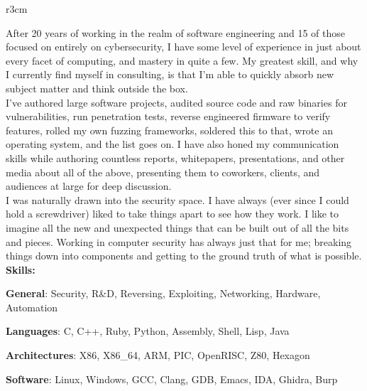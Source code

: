 \documentclass[]{SBResume}
\begin{document}
\makeheader


\begin{resume}
  
  \begin{resumetext}
    \begin{wrapfigure}{r}{3cm}
    \insertheadshot
    \end{wrapfigure}

    After 20 years of working in the realm of software engineering and 15 of
    those focused on entirely on cybersecurity, I have some level of experience
    in just about every facet of computing, and mastery in quite a few. My
    greatest skill, and why I currently find myself in consulting, is that I'm
    able to quickly absorb new subject matter and think outside the box.\\

    I've authored large software projects, audited source code and raw binaries
    for vulnerabilities, run penetration tests, reverse engineered firmware to
    verify features, rolled my own fuzzing frameworks, soldered this to that,
    wrote an operating system, and the list goes on. I have also honed my
    communication skills while authoring countless reports, whitepapers,
    presentations, and other media about all of the above, presenting them to
    coworkers, clients, and audiences at large for deep discussion.\\

    I was naturally drawn into the security space. I have always (ever since I
    could hold a screwdriver) liked to take things apart to see how they work. I
    like to imagine all the new and unexpected things that can be built out of
    all the bits and pieces. Working in computer security has always just that
    for me; breaking things down into components and getting to the ground truth
    of what is possible.\\

    \textbf{Skills:}
    \begin{resumeitemize2}
    \item{\textbf{General}: Security, R\&D, Reversing, Exploiting, Networking, Hardware, Automation}
    \item{\textbf{Languages}: C, C++, Ruby, Python, Assembly, Shell, Lisp, Java}
    \item{\textbf{Architectures}: X86, X86\_64, ARM, PIC, OpenRISC, Z80, Hexagon }
    \item{\textbf{Software}: Linux, Windows, GCC, Clang, GDB, Emacs, IDA, Ghidra, Burp}
    \end{resumeitemize2}
    

\end{resumetext}
\end{resume}
\end{document}
